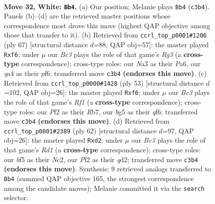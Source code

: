 \documentclass[11pt]{article}
\begin{document}
\clearpage

\begin{figure}[p]\centering
\begin{subfigure}{0.46\textwidth}\centering
\resizebox{\linewidth}{!}{%
\newchessgame
\chessboard[
  setfen={r3r3/1pp3kp/5p2/3p1bb1/q2K4/N1B1P3/P2N1P2/R7 w - - 0 32},
  showmover=false,
  pgfstyle=straightmove, color=movearrow, markmove={c3-b4}
]}
\caption{}
\end{subfigure}\hfill
\begin{subfigure}{0.46\textwidth}\centering
\resizebox{\linewidth}{!}{%
\newchessgame
\chessboard[
  setfen={4r3/1p4k1/p1p2Pr1/P4b2/3Qp3/2P4n/1PB2P2/3R3K b - - 0 34},
  showmover=false,
  pgfstyle=straightmove, color=movearrow, markmove={g6-f6}
]}
\caption{}
\end{subfigure}
\\[4pt]
\begin{subfigure}{0.46\textwidth}\centering
\resizebox{\linewidth}{!}{%
\newchessgame
\chessboard[
  setfen={5rk1/1r5p/1n1p1Q2/2pP1p2/1p6/1P5P/R3BPP1/R5K1 b - - 0 27},
  showmover=false,
  pgfstyle=straightmove, color=movearrow, markmove={f8-f6}
]}
\caption{}
\end{subfigure}\hfill
\begin{subfigure}{0.46\textwidth}\centering
\resizebox{\linewidth}{!}{%
\newchessgame
\chessboard[
  setfen={6r1/pb5k/1p3b2/3p1P2/7p/5B1p/PPNqPP2/3R3K w - - 0 32},
  showmover=false,
  pgfstyle=straightmove, color=movearrow, markmove={d1-d2}
]}
\caption{}
\end{subfigure}
\caption{\textbf{Move 32, White: \texttt{Bb4}.} (a) Our position; Melanie plays \texttt{Bb4} (\texttt{c3b4}). Panels (b)--(d) are the retrieved master positions whose correspondence most drove this move (highest QAP objective among those that transfer to it). (b) Retrieved from \texttt{ccrl\_top\_p0001\#1206} (ply 67) [structural distance $d$=88, QAP obj=57]: the master played \texttt{Rxf6}; under $\mu$ our \emph{Bc3} plays the role of that game's \emph{Rg3} (a \textbf{cross-type} correspondence); cross-type roles: our \emph{N}a3 as their \emph{P}a6, our \emph{q}a4 as their \emph{p}f6; transferred move \texttt{c3b4} \textbf{(endorses this move)}. (c) Retrieved from \texttt{ccrl\_top\_p0000\#1428} (ply 53) [structural distance $d$=102, QAP obj=26]: the master played \texttt{Rxf6}; under $\mu$ our \emph{Bc3} plays the role of that game's \emph{Rf1} (a \textbf{cross-type} correspondence); cross-type roles: our \emph{P}f2 as their \emph{R}b7, our \emph{b}g5 as their \emph{q}f6; transferred move \texttt{c3b4} \textbf{(endorses this move)}. (d) Retrieved from \texttt{ccrl\_top\_p0001\#2389} (ply 62) [structural distance $d$=97, QAP obj=26]: the master played \texttt{Rxd2}; under $\mu$ our \emph{Bc3} plays the role of that game's \emph{Rd1} (a \textbf{cross-type} correspondence); cross-type roles: our \emph{b}f5 as their \emph{N}c2, our \emph{P}f2 as their \emph{q}d2; transferred move \texttt{c3b4} \textbf{(endorses this move)}. Synthesis: 9 retrieved analogs transferred to \texttt{Bb4} (summed QAP objective 165, the strongest correspondence among the candidate moves); Melanie committed it via the \texttt{search} selector.}
\label{fig:thought-m62}
\end{figure}
\end{document}
